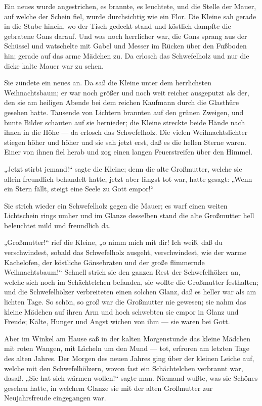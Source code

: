 \documentclass{scrartcl}
\begin{document}
Ein neues wurde angestrichen, es brannte, es leuchtete, und die Stelle der Mauer, auf welche der Schein fiel, wurde durchsichtig wie ein Flor. Die Kleine sah gerade in die Stube hinein, wo der Tisch gedeckt stand und köstlich dampfte die gebratene Gans darauf. Und was noch herrlicher war, die Gans sprang aus der Schüssel und watschelte mit Gabel und Messer im Rücken über den Fußboden hin; gerade auf das arme Mädchen zu. Da erlosch das Schwefelholz und nur die dicke kalte Mauer war zu sehen.

Sie zündete ein neues an. Da saß die Kleine unter dem herrlichsten Weihnachtsbaum; er war noch größer und noch weit reicher ausgeputzt als der, den sie am heiligen Abende bei dem reichen Kaufmann durch die Glasthüre gesehen hatte. Tausende von Lichtern brannten auf den grünen Zweigen, und bunte Bilder schauten auf sie hernieder; die Kleine streckte beide Hände nach ihnen in die Höhe — da erlosch das Schwefelholz. Die vielen Weihnachtslichter stiegen höher und höher und sie sah jetzt erst, daß es die hellen Sterne waren. Einer von ihnen fiel herab und zog einen langen Feuerstreifen über den Himmel.

„Jetzt stirbt jemand!“ sagte die Kleine; denn die alte Großmutter, welche sie allein freundlich behandelt hatte, jetzt aber längst tot war, hatte gesagt: „Wenn ein Stern fällt, steigt eine Seele zu Gott empor!“

Sie strich wieder ein Schwefelholz gegen die Mauer; es warf einen weiten Lichtschein rings umher und im Glanze desselben stand die alte Großmutter hell beleuchtet mild und freundlich da.

„Großmutter!“ rief die Kleine, „o nimm mich mit dir! Ich weiß, daß du verschwindest, sobald das Schwefelholz ausgeht, verschwindest, wie der warme Kachelofen, der köstliche Gänsebraten und der große flimmernde Weihnachtsbaum!“ Schnell strich sie den ganzen Rest der Schwefelhölzer an, welche sich noch im Schächtelchen befanden, sie wollte die Großmutter festhalten; und die Schwefelhölzer verbreiteten einen solchen Glanz, daß es heller war als am lichten Tage. So schön, so groß war die Großmutter nie gewesen; sie nahm das kleine Mädchen auf ihren Arm und hoch schwebten sie empor in Glanz und Freude; Kälte, Hunger und Angst wichen von ihm — sie waren bei Gott.

Aber im Winkel am Hause saß in der kalten Morgenstunde das kleine Mädchen mit roten Wangen, mit Lächeln um den Mund — tot, erfroren am letzten Tage des alten Jahres. Der Morgen des neuen Jahres ging über der kleinen Leiche auf, welche mit den Schwefelhölzern, wovon fast ein Schächtelchen verbrannt war, dasaß. „Sie hat sich wärmen wollen!“ sagte man. Niemand wußte, was sie Schönes gesehen hatte, in welchem Glanze sie mit der alten Großmutter zur Neujahrsfreude eingegangen war.

\directlua{}
\end{document}
